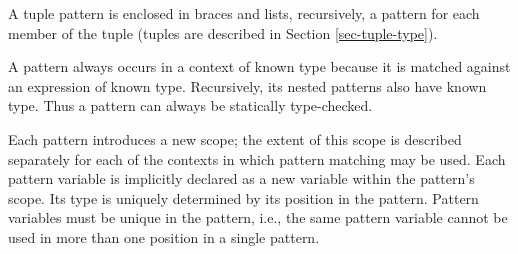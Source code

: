 \documentclass[twoside,letterpaper]{article}
\begin{document}
A tuple pattern is enclosed in braces and lists, recursively, a
pattern for each member of the tuple (tuples are described in Section
\ref{sec-tuple-type}).

A pattern always occurs in a context of known type because it is
matched against an expression of known type.  Recursively, its nested
patterns also have known type.  Thus a pattern can always be
statically type-checked.

Each pattern introduces a new scope; the extent of this scope is
described separately for each of the contexts in which pattern
matching may be used.  Each pattern variable is implicitly declared as
a new variable within the pattern's scope.  Its type is uniquely
determined by its position in the pattern.  Pattern variables must be
unique in the pattern, i.e., the same pattern variable cannot be used
in more than one position in a single pattern.
\end{document}
